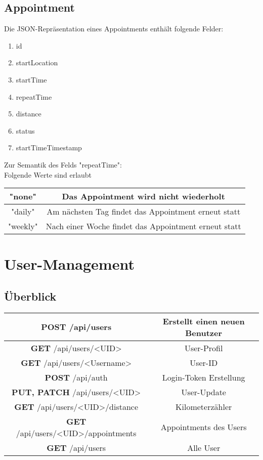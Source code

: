 \documentclass[11pt,a4paper]{article}
\begin{document}
\subsection{Appointment}
Die JSON-Repräsentation eines Appointments enthält folgende Felder:
\begin{enumerate}
    \item id
    \item startLocation
    \item startTime
    \item repeatTime
    \item distance
    \item status
    \item startTimeTimestamp
\end{enumerate}
Zur Semantik des Felds "repeatTime":\\
Folgende Werte sind erlaubt

\begin{tabular}{|c|c|}
    \hline
    "none" & Das Appointment wird nicht wiederholt\\
    \hline
    "daily" & Am nächsten Tag findet das Appointment erneut statt\\
    \hline
    "weekly" & Nach einer Woche findet das Appointment erneut statt\\
    \hline
\end{tabular}


\section{User-Management}
\subsection{Überblick}
\begin{tabular}{|c|c|}
\hline
\textbf{POST} /api/users & Erstellt einen neuen Benutzer \\
\hline
\textbf{GET} /api/users/<UID> & User-Profil \\
\hline
\textbf{GET} /api/users/<Username> & User-ID \\
\hline
\textbf{POST} /api/auth & Login-Token Erstellung \\
\hline
\textbf{PUT, PATCH} /api/users/<UID> & User-Update \\
\hline
\textbf{GET} /api/users/<UID>/distance & Kilometerzähler \\
\hline
\textbf{GET} /api/users/<UID>/appointments & Appointments des Users \\
\hline
\textbf{GET} /api/users & Alle User\\
\hline
\end{tabular}
\end{document}
